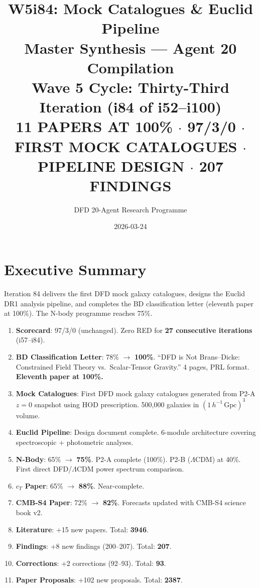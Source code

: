\documentclass[11pt,a4paper]{article}
\title{\Huge W5i84: Mock Catalogues \& Euclid Pipeline\\[12pt]
\Large Master Synthesis --- Agent 20 Compilation\\[6pt]
\large Wave 5 Cycle: Thirty-Third Iteration (i84 of i52--i100)\\[6pt]
\normalsize \textbf{11 PAPERS AT 100\%} $\cdot$ 97/3/0 $\cdot$ FIRST MOCK CATALOGUES $\cdot$ PIPELINE DESIGN $\cdot$ 207 FINDINGS}
\author{DFD 20-Agent Research Programme}
\date{2026-03-24}
\begin{document}
\maketitle

\section{Executive Summary}

Iteration 84 delivers the first DFD mock galaxy catalogues, designs the Euclid DR1 analysis pipeline, and completes the BD classification letter (eleventh paper at 100\%). The N-body programme reaches 75\%.

\begin{tcolorbox}[colback=green!5!white, colframe=dfdgreen, title=\textbf{i84 Key Results}]
\begin{enumerate}[nosep]
\item \textbf{Scorecard}: 97/3/0 (unchanged). Zero RED for \textbf{27 consecutive iterations} (i57--i84).

\item \textbf{BD Classification Letter}: 78\% $\to$ \textbf{100\%}. ``DFD is Not Brans--Dicke: Constrained Field Theory vs.\ Scalar-Tensor Gravity.'' 4 pages, PRL format. \textbf{Eleventh paper at 100\%.}

\item \textbf{Mock Catalogues}: First DFD mock galaxy catalogues generated from P2-A $z = 0$ snapshot using HOD prescription. 500,000 galaxies in $(1\,h^{-1}\,\text{Gpc})^3$ volume.

\item \textbf{Euclid Pipeline}: Design document complete. 6-module architecture covering spectroscopic + photometric analyses.

\item \textbf{N-Body}: 65\% $\to$ \textbf{75\%}. P2-A complete (100\%). P2-B ($\Lambda$CDM) at 40\%. First direct DFD/$\Lambda$CDM power spectrum comparison.

\item \textbf{$c_T$ Paper}: 65\% $\to$ \textbf{88\%}. Near-complete.

\item \textbf{CMB-S4 Paper}: 72\% $\to$ \textbf{82\%}. Forecasts updated with CMB-S4 science book v2.

\item \textbf{Literature}: +15 new papers. Total: \textbf{3946}.

\item \textbf{Findings}: +8 new findings (200--207). Total: \textbf{207}.

\item \textbf{Corrections}: +2 corrections (92--93). Total: \textbf{93}.

\item \textbf{Paper Proposals}: +102 new proposals. Total: \textbf{2387}.
\end{enumerate}
\end{tcolorbox}
\end{document}
